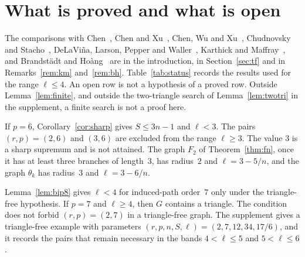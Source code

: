 \documentclass[ASNA]{USG}
\theoremstyle{WBstyletwo}
\numberwithin{equation}{section}
\newcommand{\lr}{\ell}
\newcommand{\pp}{p}
\begin{document}
\section{What is proved and what is open}\label{sec:status}\label{sec:open}\label{sec:notclaimed}

The comparisons with Chen~\cite{chen}, Chen and Xu~\cite{chenxu}, Chen, Wu and Xu~\cite{cwx}, Chudnovsky and Stacho~\cite{chudstacho}, DeLaVi\~na, Larson, Pepper and Waller~\cite{dlpw}, Karthick and Maffray~\cite{km}, and Brandst\"adt and Ho\`ang~\cite{bh} are in the introduction, in Section~\ref{sec:tf} and in Remarks~\ref{rem:km} and~\ref{rem:bh}. Table~\ref{tab:status} records the results used for the range $\lr\le 4$. An open row is not a hypothesis of a proved row. Outside Lemma~\ref{lem:finite}, and outside the two-triangle search of Lemma~\ref{lem:twotri} in the supplement, a finite search is not a proof here.

If $\pp=6$, Corollary~\ref{cor:sharp} gives $S\le 3n-1$ and $\lr<3$. The pairs $(r,\pp)=(2,6)$ and $(3,6)$ are excluded from the range $\lr\ge 3$. The value $3$ is a sharp supremum and is not attained. The graph $F_2$ of Theorem~\ref{thm:fn}, once it has at least three branches of length~$3$, has radius~$2$ and $\lr=3-5/n$, and the graph $\theta_k$ has radius~$3$ and $\lr=3-6/n$.

Lemma~\ref{lem:bip8} gives $\lr<4$ for induced-path order~$7$ only under the triangle-free hypothesis. If $\pp=7$ and $\lr\ge 4$, then $G$ contains a triangle. The condition does not forbid $(r,\pp)=(2,7)$ in a triangle-free graph. The supplement gives a triangle-free example with parameters $(r,\pp,n,S,\lr)=(2,7,12,34,17/6)$, and it records the pairs that remain necessary in the bands $4<\lr\le 5$ and $5<\lr\le 6$.
\end{document}
